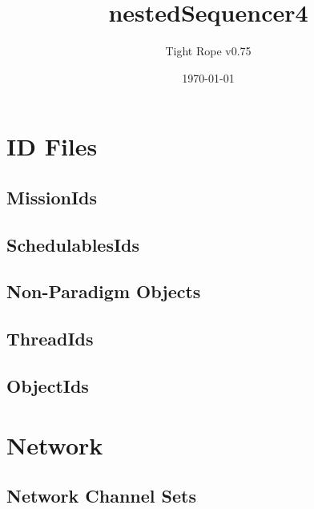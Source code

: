 \documentclass[10pt,a4paper]{article}
\title{nestedSequencer4}
\author{Tight Rope v0.75}
\date{\today}
\begin{document}
\maketitle

\section{ID Files}
\subsection{MissionIds}

\newpage

\subsection{SchedulablesIds}

\newpage

\subsection{Non-Paradigm Objects}
\newpage

\subsection{ThreadIds}

\newpage

\subsection{ObjectIds}

\newpage

\section{Network}
\subsection{Network Channel Sets}




{}
\end{document}
